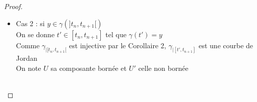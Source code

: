 \documentclass{article}
\begin{document}
\begin{flushleft}
\begin{proof}
\begin{itemize}
        \\~\\
        Pour cela, considérons $C_1$ et $C_2$ deux composantes connexes par arcs de $V \cap U$ et montrons qu'elles
        appartiennent à $C_{\gamma}(t_{n+1}) \backslash C_{\gamma}(t_n)$\\
        On mène pour cela une démonstration très similaire au Lemme d'apparition, en exploitant le fait que
        $\operatorname{Fr}(V \cap U) \cap V = \gamma(]t_n, t_{n+1}[)$ par construction
        \\~\\
        Par la Proposition 10, $\operatorname{Fr}(C_1) \cap \gamma(]t_n, t_{n+1}[) \neq \varnothing$ et de même pour $C_2$\\
        On se donne alors $t \leq t' \in ]t_n, t_{n+1}[$ tels que $\gamma(t)$ et $\gamma(t')$ appartiennent respectivement à ces
        intersections\\
        Comme $\gamma([t, t']) \subset V$ et est compact, on se donne $r > 0$ tel que pour tout point de $\gamma([t, t'])$,
        la boule centrée en ce point de rayon $r$ est incluse dans $V$\\
        Comme $\gamma(t)$ et $\gamma(t')$ sont des points frontière, il existe dans tout voisinage de ces points respectivement des
        points de $C_1$ ou $C_2$\\
        Par ce qui precède et la Proposition 7, il existe donc un chemin dans $V \cap U$ de $C_1$ à $C_2$ et donc $C_1 = C_2$\\
        $V \cap U$ est bien connexe par arcs et par le même raisonnement $V \cap U'$ également
        \\~\\
        Par la Proposition 5, comme ce sont des ouverts connexes par arc formant une partition de $V \backslash \gamma([t_n, t_{n+1}])$, il s'agit
        de ses composantes connexes par arc
        \\~\\
        \item Cas 2 : si $y \in \gamma(]t_n, t_{n+1}[)$\\
        On se donne $t' \in [t_n, t_{n+1}]$ tel que $\gamma(t') = y$\\
        Comme $\gamma_{\mid [t_n, t_{n+1}[}$ est injective par le Corollaire 2, $\gamma_{\mid [t', t_{n+1}]}$ est une courbe de Jordan\\
        On note $U$ sa composante bornée et $U'$ celle non bornée
        \\~\\

\end{itemize}
\end{proof}
\end{flushleft}
\end{document}
